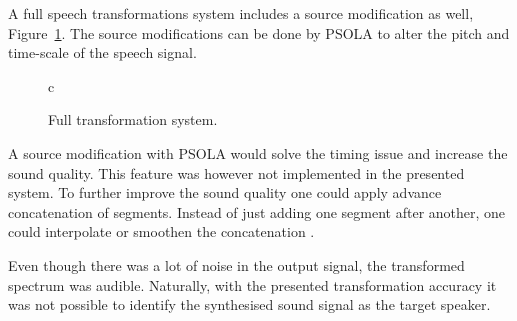 A full speech transformations system includes a source modification as well, Figure~\ref{fig:VC_full}. The source modifications can be done by PSOLA \cite[p.820]{taletek} to alter the pitch and time-scale of the speech signal.
\begin{figure}[htbp]
  \centering
   \begin{tabular}[h]{c}
  \end{tabular}
  \caption{Full transformation system.}
  \label{fig:VC_full}
\end{figure}
A source modification with PSOLA would solve the timing issue and increase the sound quality. This feature was however not implemented in the presented system. To further improve the sound quality one could apply advance concatenation of segments. Instead of just adding one segment after another, one could interpolate or smoothen the concatenation \cite{chappell02}.

Even though there was a lot of noise in the output signal, the transformed spectrum was audible. Naturally, with the presented transformation accuracy it was not possible to identify the synthesised sound signal as the target speaker.


